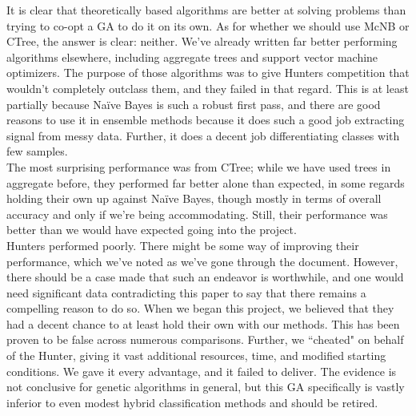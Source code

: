 It is clear that theoretically based algorithms are better at solving problems than trying to co-opt a GA to do it on its own.  
As for whether we should use McNB or CTree, the answer is clear: neither.  We've already written far better performing algorithms elsewhere, including aggregate trees and support vector machine optimizers.  The purpose of those algorithms was to give Hunters competition that wouldn't completely outclass them, and they failed in that regard.  This is at least partially because Na\"ive Bayes is such a robust first pass, and there are good reasons to use it in ensemble methods because it does such a good job extracting signal from messy data.  Further, it does a decent job differentiating classes with few samples.\\
The most surprising performance was from CTree; while we have used trees in aggregate before, they performed far better alone than expected, in some regards holding their own up against Na\"ive Bayes, though mostly in terms of overall accuracy and only if we're being accommodating.  Still, their performance was better than we would have expected going into the project.\\
Hunters performed poorly.  There might be some way of improving their performance, which we've noted as we've gone through the document.  However, there should be a case made that such an endeavor is worthwhile, and one would need significant data contradicting this paper to say that there remains a compelling reason to do so.  When we began this project, we believed that they had a decent chance to at least hold their own with our methods.  This has been proven to be false across numerous comparisons.  Further, we ``cheated" on behalf of the Hunter, giving it vast additional resources, time, and modified starting conditions.  We gave it every advantage, and it failed to deliver.  The evidence is not conclusive for genetic algorithms in general, but this GA specifically is vastly inferior to even modest hybrid classification methods and should be retired.  
